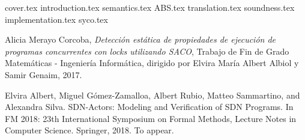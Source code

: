 \documentclass[spanish, a4paper, 12pt] {book}
\begin{document}
{cover.tex}
\tableofcontents
{introduction.tex}
{semantics.tex}
{ABS.tex}
{translation.tex}
{soundness.tex}
{implementation.tex}
{syco.tex}

\begin{thebibliography}{9}

  Alicia Merayo Corcoba,
  \textit{Detección estática de propiedades de ejecución de programas concurrentes con locks utilizando SACO},
  Trabajo de Fin de Grado Matemáticas - Ingeniería Informática,
  dirigido por Elvira María Albert Albiol y Samir Genaim,
  2017.

 Elvira Albert, Miguel Gómez-Zamalloa, Albert Rubio, Matteo Sammartino, and Alexandra Silva. SDN-Actors: Modeling and Verification of SDN Programs. In FM 2018: 23th International Symposium on Formal Methods, Lecture Notes in Computer Science. Springer, 2018. To appear.
\end{thebibliography}
\end{document}
